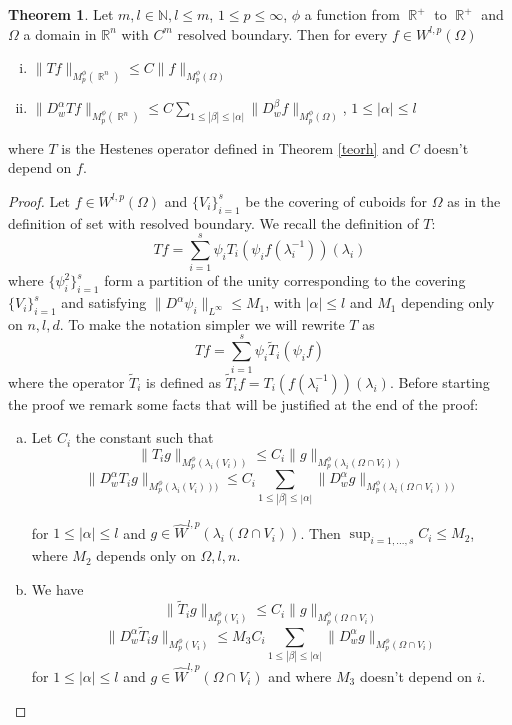 \documentclass[12pt]{article}
\theoremstyle{definition}
\newtheorem{theorem}{Theorem}
\DeclareMathOperator\rr{\mathbb{R}}
\begin{document}
\begin{theorem}
Let $m,l \in \mathbb{N}, l\le m$, $1\le p\le\infty$, $\phi$ a function from $\rr^+$ to $\rr^+$ and $\Omega$ a domain in $\mathbb{R}^n$ with $C^m$ resolved boundary. Then for every $f \in W^{l,p}(\Omega)$ 
\begin{enumerate}[i)]
\item  $\| Tf\|_{M_p^\phi(\rr^n)} \le    C\| f\|_{M_p^\phi(\Omega)}$
\item $\| D^\alpha_w Tf\|_{M_p^\phi(\rr^n)} \le   C\sum_{1\le |\beta|\le|\alpha| }\| D^\beta_wf\|_{M_p^\phi(\Omega)}$,  $1\le |\alpha|\le l$
\end{enumerate}
where $ T$ is the Hestenes operator defined in Theorem \ref{teorh} and $C$ doesn't depend on $f$.
\end{theorem}
\begin{proof}
Let $f \in W^{l,p}(\Omega)$ and  $\{V_i\}_{i=1}^s$ be the covering of cuboids for $\Omega$ as in the definition of set with resolved boundary. We recall the definition of $T:$
\[ Tf = \sum_{i=1}^s \psi_iT_i(\psi_if(\lambda_i^{-1}))(\lambda_i)\]
where $\{ \psi^2_i \}_{i=1}^s$ form a partition of the unity corresponding to the covering $\{V_i\}_{i=1}^s$ and satisfying $\|D^\alpha \psi_i \|_{L^\infty}\le M_1$, with $|\alpha|\le l$ and $M_1$ depending only on $n,l,d$. To make the notation simpler we will rewrite $T$ as
\[ Tf = \sum_{i=1}^s \psi_i\widetilde T_i(\psi_if)\]
where the operator $\widetilde T_i$ is defined as $\widetilde T_i f = T_i(f(\lambda_i^{-1}))(\lambda_i)$. 
Before starting the proof we remark some facts that will be justified at the end of the proof:
\begin{enumerate}[a)]

\item Let $C_i$ the constant such that
\[ \| T_ig\|_{M_p^\phi(\lambda_i(V_i))}\le C_i \|g\|_{M_p^\phi(\lambda_i(\Omega \cap V_i))}\]
\[\| D^\alpha_w T_ig\|_{M_p^\phi(\lambda_i(V_i)))} \le   C_i\sum_{1\le |\beta|\le|\alpha| }\| D^\alpha_wg\|_{M_p^\phi(\lambda_i(\Omega \cap V_i)))}\]  

for $1\le |\alpha|\le l$ and $g \in \widehat W^{l,p}(\lambda_i(\Omega \cap V_i))$. Then $\sup_{i=1,...,s} C_i \le M_2$, where $M_2$ depends only on $\Omega,l,n$.
\item We have
\[ \| \widetilde T_ig\|_{M_p^\phi(V_i)}\le C_i \|g\|_{M_p^\phi(\Omega \cap V_i)}\]
\[\| D^\alpha_w \widetilde T_ig\|_{M_p^\phi(V_i)} \le   M_3C_i\sum_{1\le |\beta|\le|\alpha| }\| D^\alpha_wg\|_{M_p^\phi(\Omega \cap V_i)}\]  
for $1\le |\alpha|\le l$ and $g \in \widehat W^{l,p}(\Omega \cap V_i)$ and where $M_3$ doesn't depend on $i$. 
\end{enumerate}





\end{proof}
\end{document}
